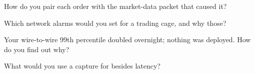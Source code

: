 \begin{interviewq}\label{iq:nw:capturing-and-monitoring-the-network:3}
How do you pair each order with the market-data packet that caused it?
\end{interviewq}

\begin{interviewq}\label{iq:nw:capturing-and-monitoring-the-network:4}
Which network alarms would you set for a trading cage, and why those?
\end{interviewq}

\begin{interviewq}\label{iq:nw:capturing-and-monitoring-the-network:5}
Your wire-to-wire 99th percentile doubled overnight; nothing was deployed. How do you find out why?
\end{interviewq}

\begin{interviewq}\label{iq:nw:capturing-and-monitoring-the-network:6}
What would you use a capture for besides latency?
\end{interviewq}

